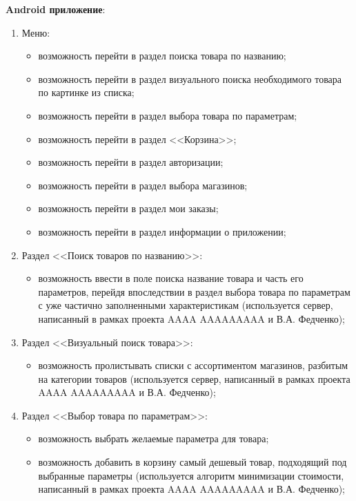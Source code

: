\documentclass[a4paper,12pt]{article}
\begin{document}
  \noindent\textbf{Android приложение}:
  \begin{enumerate}
    \item Меню:
    \begin{itemize}
      \item возможность перейти в раздел поиска товара по названию;
      \item возможность перейти в раздел визуального поиска необходимого товара по картинке из списка;
      \item возможность перейти в раздел выбора товара по параметрам;
      \item возможность перейти в раздел <<Корзина>>;
      \item возможность перейти в раздел авторизации;
      \item возможность перейти в раздел выбора магазинов;
      \item возможность перейти в раздел мои заказы;
      \item возможность перейти в раздел информации о приложении;
    \end{itemize}
    \item Раздел <<Поиск товаров по названию>>:
    \begin{itemize}
      \item возможность ввести в поле поиска название товара и часть его параметров, перейдя впоследствии в раздел выбора товара по параметрам с уже частично заполненными характеристикам (используется сервер, написанный в рамках проекта AAAA AAAAAAAAA и В.А. Федченко);
    \end{itemize}
    \item Раздел <<Визуальный поиск товара>>:
    \begin{itemize}
      \item возможность пролистывать списки с ассортиментом магазинов, разбитым на категории товаров (используется сервер, написанный в рамках проекта AAAA AAAAAAAAA и В.А. Федченко);
    \end{itemize}
    \item Раздел <<Выбор товара по параметрам>>:
    \begin{itemize}
      \item возможность выбрать желаемые параметра для товара;
      \item возможность добавить в корзину самый дешевый товар, подходящий под выбранные параметры (используется алгоритм минимизации стоимости, написанный в рамках проекта AAAA AAAAAAAAA и В.А. Федченко);
    \end{itemize}

\end{enumerate}
\end{document}
